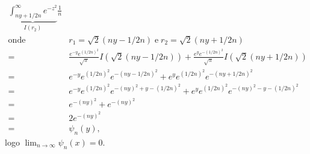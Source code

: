 \documentclass{article}
\begin{document}
\begin{enumerate}
\begin{enumerate}
$$\begin{aligned}
					\underbrace{ \int_{ny+1/2n}^{\infty} e^{-z^{2}} }_{I(r_{2})} \frac{1}{n}
					\\
					\text{onde} \;& r_{1}=\sqrt{2}(ny-1/2n) \; \text{e} \; r_{2}=\sqrt{2}(ny+1/2n)
					\\
					= & \frac{e^{-y}e^{(1/2n)^{2}}}{\sqrt{\pi}} I(\sqrt{2}(ny-1/2n)) + \frac{e^{y}e^{ - (1/2n)^{2}}}{\sqrt{\pi}}I( \sqrt{2}(ny+1/2n))
					\\
					= & e^{-y}e^{(1/2n)^{2}} e^{-(ny-1/2n)^{2}}+ e^{y}e^{ (1/2n)^{2}} e^{-(ny+1/2n)^{2}}
					\\
					= & e^{-y}e^{(1/2n)^{2}} e^{-(ny)^{2}+y - (1/2n)^{2}}+ e^{y}e^{ (1/2n)^{2}}e^{-(ny)^{2}-y - (1/2n)^{2}}
					\\
					= &  e^{-(ny)^{2}}+ e^{-(ny)^{2}}
					\\
					= & 2e^{-(ny)^{2}}
					\\
					= & \psi_{n}(y),
					\end{aligned}
					$$
					logo $\lim_{n \to \infty} \psi_{n}(x) = 0$.
					

\end{enumerate}
\end{enumerate}
\end{document}
